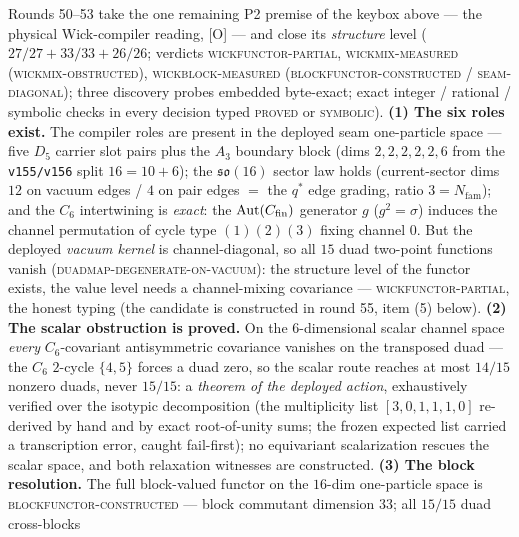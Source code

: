\documentclass[11pt,a4paper]{article}
\newcommand{\Nfam}{N_{\mathrm{fam}}}
\theoremstyle{definition}
\begin{document}
\begin{keybox}
Rounds 50--53 take the one remaining P2 premise of the keybox
above --- the physical Wick-compiler reading, [O] --- and close
its \emph{structure} level ($27/27 + 33/33 + 26/26$; verdicts
\textsc{wickfunctor-partial}, \textsc{wickmix-measured
(wickmix-obstructed)}, \textsc{wickblock-measured
(blockfunctor-constructed / seam-diagonal)}; three discovery
probes embedded byte-exact; exact integer / rational /
symbolic checks in every decision typed \textsc{proved} or
\textsc{symbolic}).  \textbf{(1) The six roles exist.}  The
compiler roles are present in the deployed seam one-particle
space --- five $D_5$ carrier slot pairs plus the $A_3$
boundary block (dims $2,2,2,2,2,6$ from the \texttt{v155/v156}
split $16 = 10 + 6$); the $\mathfrak{so}(16)$ sector law holds
(current-sector dims $12$ on vacuum edges / $4$ on pair edges
$=$ the $q^{*}$ edge grading, ratio $3 = \Nfam$); and the
$C_6$ intertwining is \emph{exact}: the $\mathrm{Aut}(C_{\rm
fin})$ generator $g$ ($g^2 = \sigma$) induces the channel
permutation of cycle type $(1)(2)(3)$ fixing channel $0$.  But
the deployed \emph{vacuum kernel} is channel-diagonal, so all
$15$ duad two-point functions vanish
(\textsc{duadmap-degenerate-on-vacuum}): the structure level
of the functor exists, the value level needs a channel-mixing
covariance --- \textsc{wickfunctor-partial}, the honest
typing (the candidate is constructed in round 55, item (5)
below).  \textbf{(2) The scalar obstruction is proved.}  On
the $6$-dimensional scalar channel space \emph{every}
$C_6$-covariant antisymmetric covariance vanishes on the
transposed duad --- the $C_6$ $2$-cycle $\{4, 5\}$ forces a
duad zero, so the scalar route reaches at most $14/15$ nonzero
duads, never $15/15$: a \emph{theorem of the deployed action},
exhaustively verified over the isotypic decomposition (the
multiplicity list $[3,0,1,1,1,0]$ re-derived by hand and by
exact root-of-unity sums; the frozen expected list carried a
transcription error, caught fail-first); no equivariant
scalarization rescues the scalar space, and both relaxation
witnesses are constructed.  \textbf{(3) The block
resolution.}  The full block-valued functor on the $16$-dim
one-particle space is \textsc{blockfunctor-constructed} ---
block commutant dimension $33$; all $15/15$ duad cross-blocks

\end{keybox}
\end{document}

